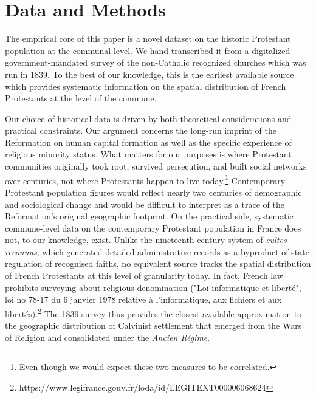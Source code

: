 \documentclass[12pt]{article}
\begin{document}

\section{Data and Methods}
The empirical core of this paper is a novel dataset on the historic Protestant population at the communal level. We hand-transcribed it from a digitalized government-mandated survey of the non-Catholic recognized churches which was run in 1839. To the best of our knowledge, this is the earliest available source which provides systematic information on the spatial distribution of French Protestants at the level of the commune. 

Our choice of historical data is driven by both theoretical considerations and practical constraints. Our argument concerns the long-run imprint of the Reformation on human capital formation as well as the specific experience of religious minority status. What matters for our purposes is where Protestant communities originally took root, survived persecution, and built social networks over centuries, not where Protestants happen to live today.\footnote{Even though we would expect these two measures to be correlated.} Contemporary Protestant population figures would reflect nearly two centuries of demographic and sociological change and would be difficult to interpret as a trace of the Reformation's original geographic footprint. On the practical side, systematic commune-level data on the contemporary Protestant population in France does not, to our knowledge, exist. Unlike the nineteenth-century system of \textit{cultes reconnus}, which generated detailed administrative records as a byproduct of state regulation of recognised faiths, no equivalent source tracks the spatial distribution of French Protestants at this level of granularity today. In fact, French law prohibits surveying about religious denomination ("Loi informatique et liberté", loi no 78-17 du 6 janvier 1978 relative à l'informatique, aux fichiers et aux libertés).\footnote{https://www.legifrance.gouv.fr/loda/id/LEGITEXT000006068624} The 1839 survey thus provides the closest available approximation to the geographic distribution of Calvinist settlement that emerged from the Wars of Religion and consolidated under the \textit{Ancien Régime}.
\end{document}
